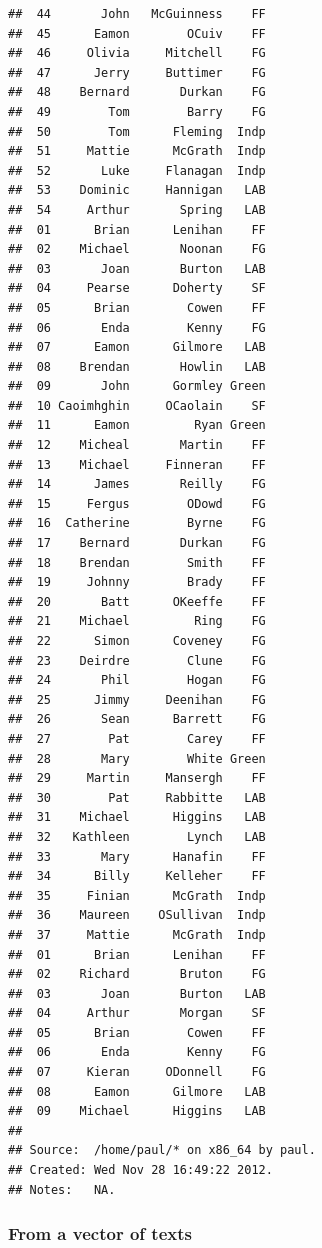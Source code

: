 \documentclass[11pt]{article}
\begin{document}
\begin{knitrout}
\begin{kframe}
\begin{verbatim}
##  44       John   McGuinness    FF
##  45      Eamon        OCuiv    FF
##  46     Olivia     Mitchell    FG
##  47      Jerry     Buttimer    FG
##  48    Bernard       Durkan    FG
##  49        Tom        Barry    FG
##  50        Tom      Fleming  Indp
##  51     Mattie      McGrath  Indp
##  52       Luke     Flanagan  Indp
##  53    Dominic     Hannigan   LAB
##  54     Arthur       Spring   LAB
##  01      Brian      Lenihan    FF
##  02    Michael       Noonan    FG
##  03       Joan       Burton   LAB
##  04     Pearse      Doherty    SF
##  05      Brian        Cowen    FF
##  06       Enda        Kenny    FG
##  07      Eamon      Gilmore   LAB
##  08    Brendan       Howlin   LAB
##  09       John      Gormley Green
##  10 Caoimhghin     OCaolain    SF
##  11      Eamon         Ryan Green
##  12    Micheal       Martin    FF
##  13    Michael     Finneran    FF
##  14      James       Reilly    FG
##  15     Fergus        ODowd    FG
##  16  Catherine        Byrne    FG
##  17    Bernard       Durkan    FG
##  18    Brendan        Smith    FF
##  19     Johnny        Brady    FF
##  20       Batt      OKeeffe    FF
##  21    Michael         Ring    FG
##  22      Simon      Coveney    FG
##  23    Deirdre        Clune    FG
##  24       Phil        Hogan    FG
##  25      Jimmy     Deenihan    FG
##  26       Sean      Barrett    FG
##  27        Pat        Carey    FF
##  28       Mary        White Green
##  29     Martin     Mansergh    FF
##  30        Pat     Rabbitte   LAB
##  31    Michael      Higgins   LAB
##  32   Kathleen        Lynch   LAB
##  33       Mary      Hanafin    FF
##  34      Billy     Kelleher    FF
##  35     Finian      McGrath  Indp
##  36    Maureen    OSullivan  Indp
##  37     Mattie      McGrath  Indp
##  01      Brian      Lenihan    FF
##  02    Richard       Bruton    FG
##  03       Joan       Burton   LAB
##  04     Arthur       Morgan    SF
##  05      Brian        Cowen    FF
##  06       Enda        Kenny    FG
##  07     Kieran     ODonnell    FG
##  08      Eamon      Gilmore   LAB
##  09    Michael      Higgins   LAB
## 
## Source:  /home/paul/* on x86_64 by paul.
## Created: Wed Nov 28 16:49:22 2012.
## Notes:   NA.
\end{verbatim}
\end{kframe}
\end{knitrout}


\subsubsection{From a vector of texts}
\end{document}

